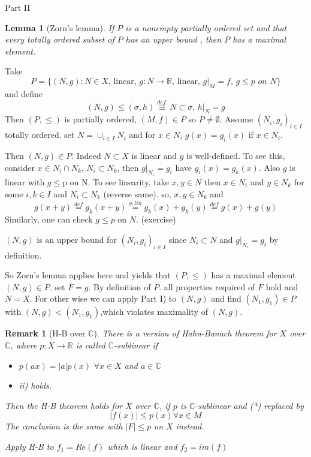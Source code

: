 \documentclass{article}
\newcommand{\nextline}{\hfill\break}
\newcommand{\func}[3]{\({#1}:{#2}\xrightarrow{}{#3}\)}
\newcommand{\real}{\mathbb{R}}
\newcommand{\comp}{\mathbb{C}}
\newtheorem{remark}[example]{Remark}
\newtheorem{lemma}[example]{Lemma}
\begin{document}
    \begin{pf}{Part II}{}
    \begin{lemma}[Zorn's lemma]%
        \rm\nextline
        If \(P\) is a nonempty partially ordered set and that every totally ordered subset of \(P\) has an upper bound , then \(P\) has
        a maximal element.
    \end{lemma}

    Take 
    $$
P=\{(N,g):N\in X,\,\text{linear},\, g:N\rightarrow\real,\,\text{linear},\,g|_M=f,\,g\leq p\,\,on\,\, N\}
    $$
    and define
    $$
    (N,g)\leq(\sigma,h)\stackrel{def.}{\equiv}N\subset\sigma,\,h|_N=g
    $$
    Then \((P,\leq)\) is partially ordered, \((M,f)\in P\) so \(P\not=\emptyset\). Assume \((N_i,g_i)_{i\in I}\) totally ordered. set \(N=\cup_{i\in I}N_i\) and for \(x\in N\), \(g(x)=g_i(x)\) if \(x\in N_i\).

    Then \((N,g)\in P\). Indeed \(N\subset X\) is linear and \(g\) is well-defined. To see this, consider \(x\in N_i\cap N_k\), \(N_i\subset N_k\), then  \(g|_{N_i}=g_i\) have \(g_i(x)=g_k(x)\). Also \(g\) is linear with \(g\leq \)p on N. To see linearity, take \(x,y\in N\) then \(x\in N_i\) and \(y \in N_k\) for some \(i,k\in I\) and \(N_i\subset N_k\) (reverse same). so, \(x,y\in N_k\) and 
    $$
g(x+y)\stackrel{def}{=}g_k(x+y)\stackrel{g,lin}{=}g_k(x)+g_k(y)\stackrel{def}{=}g(x)+g(y)
    $$
    Similarly, one can check \(g\leq p\) on \(N\). (exercise)

    \((N,g)\) is an upper bound for \((N_i,g_i)_{i\in I}\) since \(N_i\subset N\) and \(g|_{N_i}=g_i\) by definition.

    So Zorn's lemma applies here and yields that \((P,\leq)\) has a maximal element \((N,g)\in P\). set \(F=g\). By definition of \(P\). all properties required of \(F\) hold and \(N=X\). For other wise we can apply Part I) to \((N,g)\) and find \((N_1,g_1)\in P\) with \((N,g)<(N_1,g_1)\),which violates maximality of \((N,g)\). 
    \end{pf}
\newpage
\begin{remark}[H-B over \(\comp\)]\rm\nextline
    There is a version of Hahn-Banach theorem for \(X\) over \(\comp\), where \func{p}{X}{\real} is called \(\comp\)-sublinear if \begin{itemize}
        \item \(p(ax)=|a|p(x)\,\,\forall x\in X\) and \(a\in \comp\)
        \item ii) holds.
    \end{itemize}
    Then the H-B theorem holds for \(X\) over \(\comp\), if \(p\) is \(\comp\)-sublinear and (*) replaced by
    $$
    |f(x)|\leq p(x)\forall x\in M
    $$
    The conclusion is the same with \(|F|\leq p\) on \(X\) instead.
    \begin{pf}{}{}
        Apply H-B to \(f_1=Re(f)\) which is linear and \(f_2=im(f)\)
    \end{pf}
\end{remark}
\end{document}
